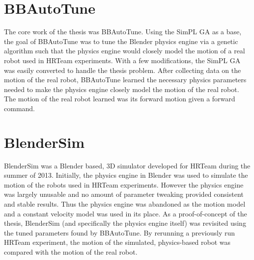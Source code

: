 \section{BBAutoTune}

The core work of the thesis was BBAutoTune. Using the SimPL GA as a base, the goal of BBAutoTune was to tune the Blender physics engine via a genetic algorithm such that the physics engine would closely model the motion of a real robot used in HRTeam experiments. With a few modifications, the SimPL GA was easily converted to handle the thesis problem. After collecting data on the motion of the real robot, BBAutoTune learned the necessary physics parameters needed to make the physics engine closely model the motion of the real robot. The motion of the real robot learned was its forward motion given a forward command.      

\section{BlenderSim}

BlenderSim was a Blender based, 3D simulator developed for HRTeam during the summer of 2013. Initially, the physics engine in Blender was used to simulate the motion of the robots used in HRTeam experiments. However the physics engine was largely unusable and no amount of parameter tweaking provided consistent and stable results. Thus the physics engine was abandoned as the motion model and a constant velocity model was used in its place. As a proof-of-concept of the thesis, BlenderSim (and specifically the physics engine itself) was revisited using the tuned parameters found by BBAutoTune. By rerunning a previously run HRTeam experiment, the motion of the simulated, physics-based robot was compared with the motion of the real robot.    

